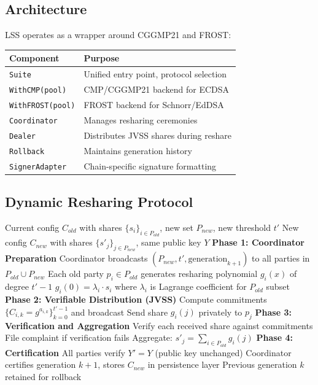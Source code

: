 \documentclass[11pt]{article}
\begin{document}
\subsection{Architecture}

LSS operates as a wrapper around CGGMP21 and FROST:

\begin{center}
\begin{tabular}{ll}
\toprule
\textbf{Component} & \textbf{Purpose} \\
\midrule
\texttt{Suite} & Unified entry point, protocol selection \\
\texttt{WithCMP(pool)} & CMP/CGGMP21 backend for ECDSA \\
\texttt{WithFROST(pool)} & FROST backend for Schnorr/EdDSA \\
\texttt{Coordinator} & Manages resharing ceremonies \\
\texttt{Dealer} & Distributes JVSS shares during reshare \\
\texttt{Rollback} & Maintains generation history \\
\texttt{SignerAdapter} & Chain-specific signature formatting \\
\bottomrule
\end{tabular}
\end{center}

\subsection{Dynamic Resharing Protocol}

\begin{algorithm}
\caption{LSS Dynamic Reshare: $(t, n) \to (t', n')$}
\begin{algorithmic}[1]
\Require Current config $C_{old}$ with shares $\{s_i\}_{i \in P_{old}}$, new set $P_{new}$, new threshold $t'$
\Ensure New config $C_{new}$ with shares $\{s'_j\}_{j \in P_{new}}$, same public key $Y$
\State \textbf{Phase 1: Coordinator Preparation}
\State Coordinator broadcasts $(P_{new}, t', \text{generation}_{k+1})$ to all parties in $P_{old} \cup P_{new}$
\State Each old party $p_i \in P_{old}$ generates resharing polynomial $g_i(x)$ of degree $t' - 1$
\State $g_i(0) = \lambda_i \cdot s_i$ where $\lambda_i$ is Lagrange coefficient for $P_{old}$ subset
\State \textbf{Phase 2: Verifiable Distribution (JVSS)}
  \State Compute commitments $\{C_{i,k} = g^{a_{i,k}}\}_{k=0}^{t'-1}$ and broadcast
    \State Send share $g_i(j)$ privately to $p_j$
  \EndFor
\EndFor
\State \textbf{Phase 3: Verification and Aggregation}
  \State Verify each received share against commitments
  \State File complaint if verification fails
  \State Aggregate: $s'_j = \sum_{i \in P_{old}} g_i(j)$
\EndFor
\State \textbf{Phase 4: Certification}
\State All parties verify $Y' = Y$ (public key unchanged)
\State Coordinator certifies generation $k+1$, stores $C_{new}$ in persistence layer
\State Previous generation $k$ retained for rollback
\end{algorithmic}
\end{algorithm}
\end{document}
